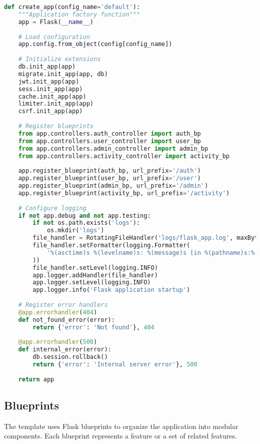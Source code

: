 \documentclass{article}
\begin{document}
\begin{lstlisting}[language=python, caption=Application Factory in app/\_\_init\_\_.py]
def create_app(config_name='default'):
    """Application factory function"""
    app = Flask(__name__)
    
    # Load configuration
    app.config.from_object(config[config_name])
    
    # Initialize extensions
    db.init_app(app)
    migrate.init_app(app, db)
    jwt.init_app(app)
    sess.init_app(app)
    cache.init_app(app)
    limiter.init_app(app)
    csrf.init_app(app)
    
    # Register blueprints
    from app.controllers.auth_controller import auth_bp
    from app.controllers.user_controller import user_bp
    from app.controllers.admin_controller import admin_bp
    from app.controllers.activity_controller import activity_bp
    
    app.register_blueprint(auth_bp, url_prefix='/auth')
    app.register_blueprint(user_bp, url_prefix='/user')
    app.register_blueprint(admin_bp, url_prefix='/admin')
    app.register_blueprint(activity_bp, url_prefix='/activity')
    
    # Configure logging
    if not app.debug and not app.testing:
        if not os.path.exists('logs'):
            os.mkdir('logs')
        file_handler = RotatingFileHandler('logs/flask_app.log', maxBytes=10240, backupCount=10)
        file_handler.setFormatter(logging.Formatter(
            '%(asctime)s %(levelname)s: %(message)s [in %(pathname)s:%(lineno)d]'
        ))
        file_handler.setLevel(logging.INFO)
        app.logger.addHandler(file_handler)
        app.logger.setLevel(logging.INFO)
        app.logger.info('Flask application startup')
    
    # Register error handlers
    @app.errorhandler(404)
    def not_found_error(error):
        return {'error': 'Not found'}, 404
    
    @app.errorhandler(500)
    def internal_error(error):
        db.session.rollback()
        return {'error': 'Internal server error'}, 500
    
    return app
\end{lstlisting}

\subsection{Blueprints}

The template uses Flask blueprints to organize the application into modular components. Each blueprint represents a feature or a set of related features.
\end{document}
